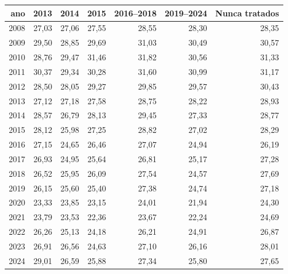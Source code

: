 \begin{tabular}{rrrrrrr}
\toprule
ano & 2013 & 2014 & 2015 & 2016–2018 & 2019–2024 & Nunca tratados \\
\midrule
2008 & 27,03 & 27,06 & 27,55 & 28,55 & 28,30 & 28,35 \\
2009 & 29,50 & 28,85 & 29,69 & 31,03 & 30,49 & 30,57 \\
2010 & 28,76 & 29,47 & 31,46 & 31,82 & 30,56 & 31,33 \\
2011 & 30,37 & 29,34 & 30,28 & 31,60 & 30,99 & 31,17 \\
2012 & 28,50 & 28,05 & 29,27 & 29,85 & 29,57 & 30,43 \\
2013 & 27,12 & 27,18 & 27,58 & 28,75 & 28,22 & 28,93 \\
2014 & 28,57 & 26,79 & 28,13 & 29,45 & 27,33 & 28,77 \\
2015 & 28,12 & 25,98 & 27,25 & 28,82 & 27,02 & 28,29 \\
2016 & 27,15 & 24,65 & 26,46 & 27,07 & 24,94 & 26,19 \\
2017 & 26,93 & 24,95 & 25,64 & 26,81 & 25,17 & 27,28 \\
2018 & 26,52 & 25,95 & 26,09 & 27,54 & 24,57 & 27,69 \\
2019 & 26,15 & 25,60 & 25,40 & 27,38 & 24,74 & 27,18 \\
2020 & 23,33 & 23,85 & 23,15 & 24,01 & 21,94 & 24,30 \\
2021 & 23,79 & 23,53 & 22,36 & 23,67 & 22,24 & 24,69 \\
2022 & 26,26 & 25,13 & 24,18 & 26,21 & 24,91 & 26,87 \\
2023 & 26,91 & 26,56 & 24,63 & 27,10 & 26,16 & 28,01 \\
2024 & 29,01 & 26,59 & 25,88 & 27,34 & 25,80 & 27,65 \\
\bottomrule
\end{tabular}
